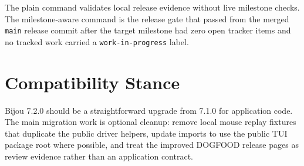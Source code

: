 The plain command validates local release evidence without live milestone checks. The milestone-aware command is the release gate that passed from the merged \texttt{m\allowbreak{}a\allowbreak{}i\allowbreak{}n} release commit after the target milestone had zero open tracker items and no tracked work carried a \texttt{w\allowbreak{}o\allowbreak{}r\allowbreak{}k\allowbreak{}-\allowbreak{}i\allowbreak{}n\allowbreak{}-\allowbreak{}p\allowbreak{}r\allowbreak{}o\allowbreak{}g\allowbreak{}r\allowbreak{}e\allowbreak{}s\allowbreak{}s} label.

\section{Compatibility Stance}\label{record-272-compatibility-stance}

Bijou 7.2.0 should be a straightforward upgrade from 7.1.0 for application code. The main migration work is optional cleanup: remove local mouse replay fixtures that duplicate the public driver helpers, update imports to use the public TUI package root where possible, and treat the improved DOGFOOD release pages as review evidence rather than an application contract.

